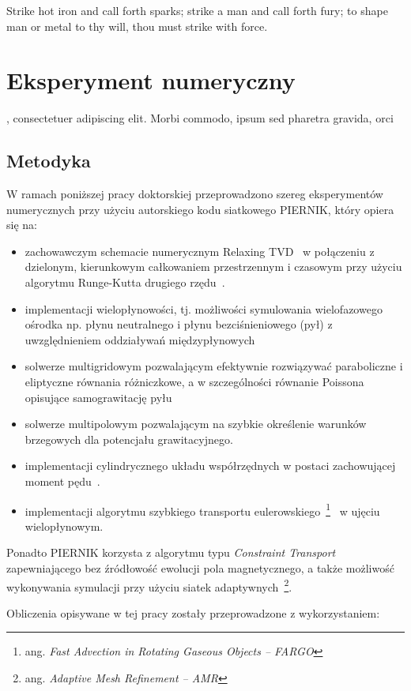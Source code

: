 \begin{savequote}[75mm]
Strike hot iron and call forth sparks; strike a man and call forth fury; to shape man or metal to thy will, thou must
strike with force.
\end{savequote}

\chapter{Eksperyment numeryczny}
, consectetuer adipiscing elit. Morbi commodo, ipsum sed pharetra gravida, orci
\section{Metodyka}
W ramach poniższej pracy doktorskiej przeprowadzono szereg eksperymentów
numerycznych przy użyciu autorskiego kodu siatkowego PIERNIK, który opiera się
na:
\begin{itemize}
   \item zachowawczym schemacie numerycznym Relaxing TVD~\cite{jin-xin-95} w
      połączeniu z dzielonym, kierunkowym całkowaniem przestrzennym i czasowym
      przy użyciu algorytmu Runge-Kutta drugiego
      rzędu~\cite{2003PASP..115..303T,2003ApJS..149..447P}.
   \item implementacji wielopłynowości, tj. możliwości symulowania wielofazowego
      ośrodka np. płynu neutralnego i płynu bezciśnieniowego (pył) z
      uwzględnieniem oddziaływań międzypłynowych~\cite{piernik1,piernik2}
   \item solwerze multigridowym pozwalającym efektywnie rozwiązywać paraboliczne
      i eliptyczne równania różniczkowe, a w szczególności równanie Poissona
      opisujące samograwitację pyłu
   \item solwerze multipolowym pozwalającym na szybkie określenie warunków
      brzegowych dla potencjału grawitacyjnego.
   \item implementacji cylindrycznego układu współrzędnych w postaci
      zachowującej moment pędu~\cite{M07,SO10}.
   \item implementacji algorytmu szybkiego transportu
      eulerowskiego~\footnote{ang. \emph{Fast Advection in Rotating Gaseous Objects --
      FARGO}}~\citep{fargo} w ujęciu wielopłynowym.

\end{itemize}
Ponadto PIERNIK korzysta z algorytmu typu \emph{Constraint Transport}
zapewniającego bez źródłowość ewolucji pola magnetycznego, a także możliwość
wykonywania symulacji przy użyciu siatek adaptywnych~\footnote{ang.
\emph{Adaptive Mesh Refinement -- AMR}}.
\par Obliczenia opisywane w tej pracy zostały przeprowadzone z
wykorzystaniem:

